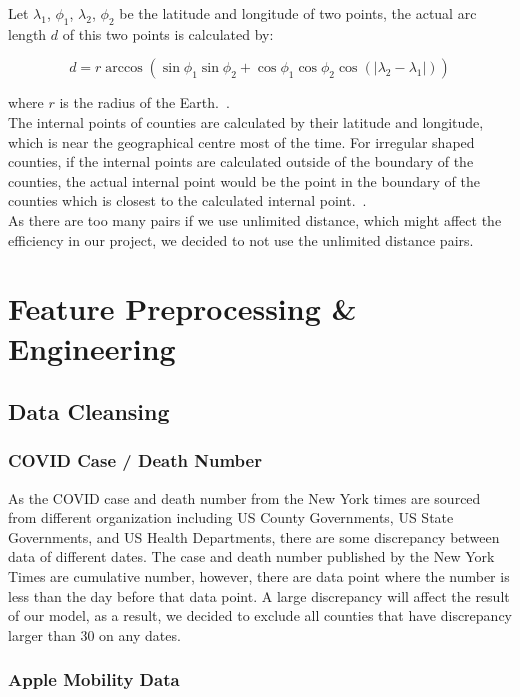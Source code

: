 Let $\lambda_1$, $\phi_1$, $\lambda_2$, $\phi_2$ be the latitude and longitude of two points, the actual arc length $d$ of this two points is calculated by:

\[d = r\arccos(\sin\phi_1\sin\phi_2+\cos\phi_1\cos\phi_2\cos(|\lambda_2-\lambda_1|))\]

where $r$ is the radius of the Earth.~\cite{countydis}.\\

The internal points of counties are calculated by their latitude and longitude, which is near the geographical centre most of the time. For irregular shaped counties, if the internal points are calculated outside of the boundary of the counties, the actual internal point would be the point in the boundary of the counties which is closest to the calculated internal point.~\cite{internalpoint}.\\

As there are too many pairs if we use unlimited distance, which might affect the efficiency in our project, we decided to not use the unlimited distance pairs. 
\section{Feature Preprocessing \& Engineering}
\subsection{Data Cleansing}
\subsubsection{COVID Case / Death Number}
As the COVID case and death number from the New York times are sourced from different organization including US County Governments, US State Governments, and US Health Departments, there are some discrepancy between data of different dates. The case and death number published by the New York Times are cumulative number, however, there are data point where the number is less than the day before that data point. A large discrepancy will affect the result of our model, as a result, we decided to exclude all counties that have discrepancy larger than 30 on any dates.  
\subsubsection{Apple Mobility Data}

